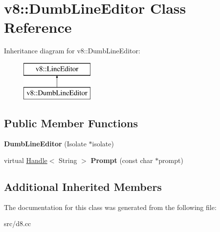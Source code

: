 \hypertarget{classv8_1_1_dumb_line_editor}{}\section{v8\+:\+:Dumb\+Line\+Editor Class Reference}
\label{classv8_1_1_dumb_line_editor}
Inheritance diagram for v8\+:\+:Dumb\+Line\+Editor\+:\begin{figure}[H]
\begin{center}
\leavevmode
\includegraphics[height=2.000000cm]{classv8_1_1_dumb_line_editor}
\end{center}
\end{figure}
\subsection*{Public Member Functions}
\begin{DoxyCompactItemize}
\item 
\hypertarget{classv8_1_1_dumb_line_editor_ace21e73e8e28f41059ac7f1529fa7285}{}{\bfseries Dumb\+Line\+Editor} (Isolate $\ast$isolate)\label{classv8_1_1_dumb_line_editor_ace21e73e8e28f41059ac7f1529fa7285}

\item 
\hypertarget{classv8_1_1_dumb_line_editor_a9343d45c41e6b5d1776a3d439484f6d4}{}virtual \hyperlink{classv8_1_1_handle}{Handle}$<$ String $>$ {\bfseries Prompt} (const char $\ast$prompt)\label{classv8_1_1_dumb_line_editor_a9343d45c41e6b5d1776a3d439484f6d4}

\end{DoxyCompactItemize}
\subsection*{Additional Inherited Members}


The documentation for this class was generated from the following file\+:\begin{DoxyCompactItemize}
\item 
src/d8.\+cc\end{DoxyCompactItemize}
